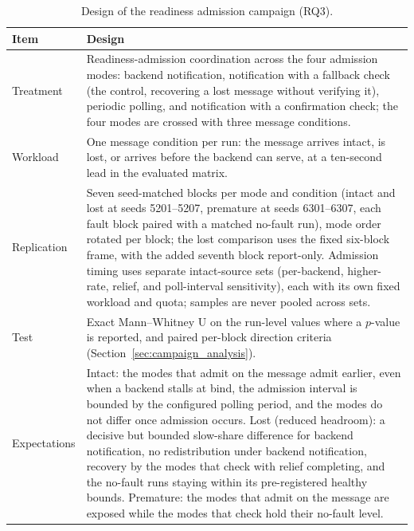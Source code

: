 ﻿\documentclass[12pt,reqno,twoside]{amsbook}
\begin{document}
\begin{table}[H]
    \centering
    \caption{Design of the readiness admission campaign (RQ3).}
    \label{tab:rq3_design}
    \footnotesize
    \begin{tabular}{p{} p{}}
        \toprule
        Item & Design \\
        \midrule
        Treatment & Readiness-admission coordination across the four
        admission modes: backend notification, notification with a fallback
        check (the control, recovering a lost message without verifying
        it), periodic polling, and notification with a confirmation check;
        the four modes are crossed with three message conditions. \\
        Workload & One message condition per run: the message arrives
        intact, is lost, or arrives before the backend can serve, at a
        ten-second lead in the evaluated matrix. \\
        Replication & Seven seed-matched blocks per mode and condition
        (intact and lost at seeds 5201--5207, premature at seeds
        6301--6307, each fault block paired with a matched no-fault run),
        mode order rotated per block; the lost comparison uses the fixed
        six-block frame, with the added seventh block report-only. Admission timing uses separate
        intact-source sets (per-backend, higher-rate, relief, and
        poll-interval sensitivity), each with its own fixed workload and
        quota; samples are never pooled across sets. \\
        Test & Exact Mann--Whitney U on the run-level values where a
        $p$-value is reported, and paired per-block direction criteria
        (Section~\ref{sec:campaign_analysis}). \\
        Expectations & Intact: the modes that admit on the message admit
        earlier, even when a backend stalls at bind, the admission interval
        is bounded by the configured polling period, and the modes do not
        differ once admission occurs. Lost (reduced headroom): a decisive
        but bounded slow-share difference for backend notification, no
        redistribution under backend notification, recovery by the modes
        that check with relief completing, and the no-fault runs staying
        within its pre-registered healthy bounds. Premature: the modes that admit on
        the message are exposed while the modes that check hold their
        no-fault level. \\
        \bottomrule
    \end{tabular}
\end{table}
\end{document}
